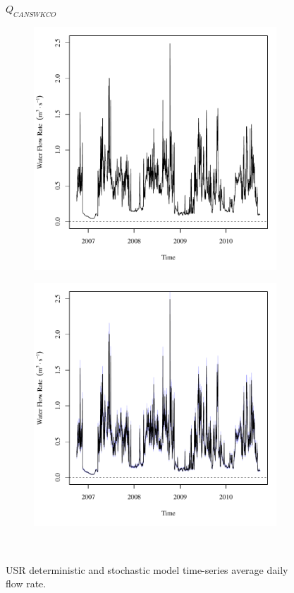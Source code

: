 \begin{landscape}
	\begin{figure}
		\centering
		$ Q_{CANSWKCO} $
		\begin{subfigure}{0.7\textwidth}
			\centering
			\includegraphics[width=\tableCustomSize]{"Figures/Results_USR/Deterministic/Q CAN"}
		\end{subfigure}%
		\begin{subfigure}{0.7\textwidth}
			\centering
			\includegraphics[width=\tableCustomSize]{"Figures/Results_USR/Stochastic/Q CAN"}
		\end{subfigure}\\
		\caption{USR deterministic and stochastic model time-series average daily flow rate.}
	\end{figure}
\end{landscape}
